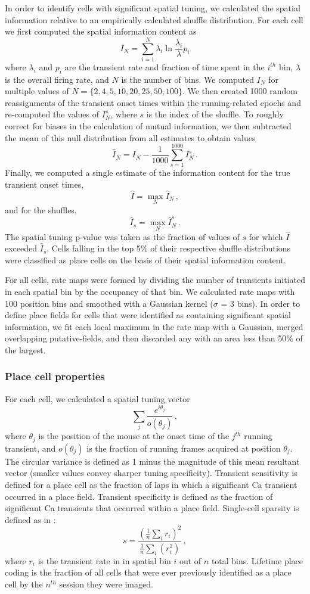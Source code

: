 In order to identify cells with significant spatial tuning, we calculated the spatial information relative to an empirically calculated shuffle distribution. For each cell we first computed the spatial information content \citep{Skaggs1993} as
$$I_N = \sum^N_{i=1}\lambda_i \ln\frac{\lambda_i}{\lambda}p_i$$
where $\lambda_i$ and $p_i$ are the transient rate and fraction of time spent in the $i^{th}$ bin, $\lambda$ is the overall firing rate, and $N$ is the number of bins. We computed $I_N$ for multiple values of $N = \{2, 4, 5, 10, 20, 25, 50, 100\}$. We then created 1000 random reassignments of the transient onset times within the running-related epochs and re-computed the values of $I^s_N$, where $s$ is the index of the shuffle. To roughly correct for biases in the calculation of mutual information, we then subtracted the mean of this null distribution from all estimates to obtain values $$\hat{I}_N = I_N - \frac{1}{1000}\sum^{1000}_{s=1}I^s_N\,.$$ Finally, we computed a single estimate of the information content for the true transient onset times,
$$\hat{I} = \max\limits_N{\hat{I}_N}\,,$$
and for the shuffles,
$$\hat{I}_s = \max\limits_N{\hat{I}_N^s}\,.$$
The spatial tuning p-value was taken as the fraction of values of $s$ for which $\hat{I}$ exceeded $\hat{I}_s$. Cells falling in the top 5\% of their respective shuffle distributions were classified as place cells on the basis of their spatial information content.

For all cells, rate maps were formed by dividing the number of transients initiated in each spatial bin by the occupancy of that bin.  We calculated rate maps with 100 position bins and smoothed with a Gaussian kernel ($\sigma$ = 3 bins). In order to define place fields for cells that were identified as containing significant spatial information, we fit each local maximum in the rate map with a Gaussian, merged overlapping putative-fields, and then discarded any with an area less than 50\% of the largest.

\subsubsection{Place cell properties}
For each cell, we calculated a spatial tuning vector
$$\sum_j\frac{e^{i\theta_j}}{o(\theta_j)}\,,$$
where $\theta_j$ is the position of the mouse at the onset time of the $j^{th}$ running transient, and $o(\theta_j)$ is the fraction of running frames acquired at position $\theta_j$. The circular variance is defined as 1 minus the magnitude of this mean resultant vector (smaller values convey sharper tuning specificity). Transient sensitivity is defined for a place cell as the fraction of laps in which a significant Ca transient occurred in a place field. Transient specificity is defined as the fraction of significant Ca transients that occurred within a place field. Single-cell sparsity is defined as in \citealt{Ahmed2009}:
$$s=\frac{(\frac{1}{n}\sum_ir_i)^2}{\frac{1}{n}\sum_i(r_i^2)}\,,$$
where $r_i$ is the transient rate in in spatial bin $i$ out of $n$ total bins. Lifetime place coding is the fraction of all cells that were ever previously identified as a place cell by the $n^{th}$ session they were imaged.

